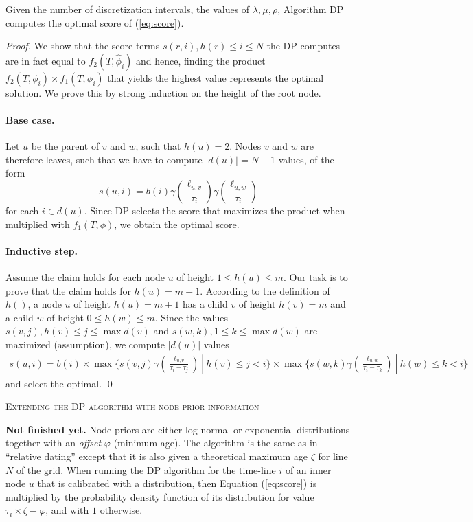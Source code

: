 \documentclass{llncs}
\renewcommand{\section}[1]{%
\bigskip
\begin{center}
\begin{Large}
\normalfont\scshape #1
\medskip
\end{Large}
\end{center}}
\begin{document}
\begin{theorem}[Optimality of DP]
Given the number of discretization intervals, the values of $\lambda,\mu,\rho$,
Algorithm DP computes the optimal score of (\ref{eq:score}).
\end{theorem}
\begin{proof}
We show that the score terms $s(r,i), h(r) \leq i \leq N$ the DP computes are
in fact equal to $f_2(T,\hat\phi_i)$ and hence, finding the product
$f_2(T,\phi_i)\times f_1(T,\phi_i)$ that yields the highest value represents the
optimal solution. We prove this by strong induction on the height of the
root node.
\paragraph{Base case.} Let $u$ be the parent of $v$ and $w$, such that $h(u) =
2$.  Nodes $v$ and $w$ are therefore leaves, such that we have to compute
$|d(u)|=N-1$ values, of the form
%
%
$$
s(u,i) = b(i)
         \gamma(\frac{\ell_{u,v}}{\tau_i})
         \gamma(\frac{\ell_{u,w}}{\tau_i})
$$
%
%
for each $i \in d(u)$. Since DP selects the score that maximizes the product
when multiplied with $f_1(T,\phi)$, we obtain the optimal score.
\paragraph{Inductive step.} Assume the claim holds for each node $u$ of height
$1 \leq h(u) \leq m$. Our task is to prove that the claim holds for $h(u) =
m+1$.  According to the definition of $h()$, a node $u$ of height $h(u)=m+1$
has a child $v$ of height $h(v)=m$ and a child $w$ of height $0 \leq h(w) \leq
m$.  Since the values $s(v,j), h(v) \leq j \leq \max d(v)$ and $s(w,k), 1 \leq
k \leq \max d(w)$ are maximized (assumption), we compute $|d(u)|$ values
%
%
\begin{equation*}
\begin{split}
s(u,i) =  b(i)\times 
          \max\{ s(v,j)\gamma(\frac{\ell_{u,v}}{\tau_i-\tau_j})\ |\
              h(v) \leq j < i\} \times 
          \max\{ s(w,k)\gamma(\frac{\ell_{u,w}}{\tau_i-\tau_k})\ |\ 
               h(w) \leq k < i\}
\end{split}
\end{equation*}
%
%
and select the optimal.
\qed\end{proof}

\section{Extending the DP algorithm with node prior information}
\textbf{Not finished yet.} Node priors are either log-normal or exponential
distributions together with an {\em offset} $\varphi$ (minimum age).  The
algorithm is the same as in ``relative dating'' except that it is also given a
theoretical maximum age $\zeta$ for line $N$ of the grid.  When running the DP
algorithm for the time-line $i$ of an inner node $u$ that is calibrated with a
distribution, then Equation (\ref{eq:score}) is multiplied by the probability
density function of its distribution for value $\tau_i \times \zeta - \varphi$,
and with $1$ otherwise.
\end{document}
